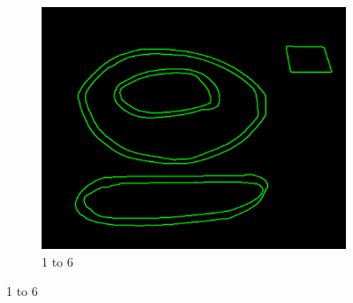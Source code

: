 \documentclass[11pt]{article}
\begin{document}
\begin{figure}[H]
\begin{subfigure}[t]{0.32\textwidth}
		\includegraphics[scale=0.28]{pics/elimination/joinedAfterRemoval6.png}
		\caption{1 to 6}
		\label{construction6}
	\end{subfigure}


\end{figure}
\end{document}

